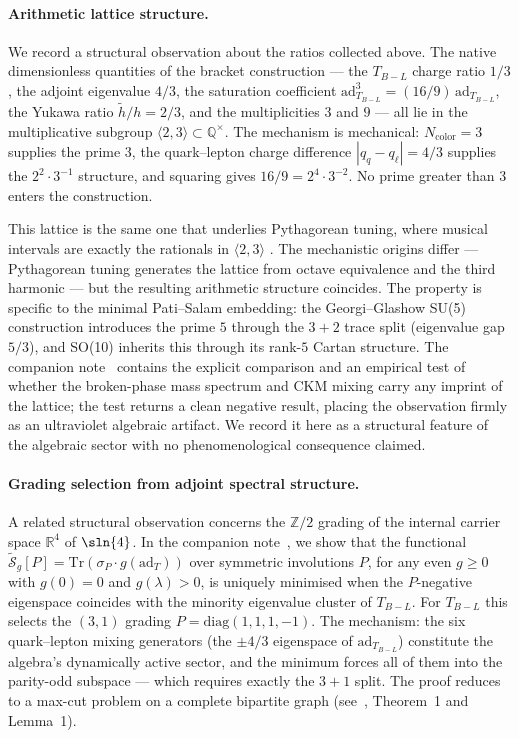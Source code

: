 \documentclass[11pt,a4paper]{article}
\theoremstyle{plain}
\theoremstyle{definition}
\theoremstyle{remark}
\begin{document}
\paragraph{Arithmetic lattice structure.}
We record a structural observation about the ratios collected above.
The native dimensionless quantities of the bracket
construction --- the $T_{B-L}$ charge ratio $1/3$, the adjoint
eigenvalue $4/3$, the saturation coefficient
$\mathrm{ad}_{T_{B-L}}^3 = (16/9)\,\mathrm{ad}_{T_{B-L}}$, the Yukawa ratio
$\tilde{h}/h = 2/3$, and the multiplicities $3$ and $9$ --- all lie
in the multiplicative subgroup
$\langle 2, 3 \rangle \subset \mathbb{Q}^\times$.  The mechanism is
mechanical: $N_{\mathrm{color}} = 3$ supplies the prime $3$, the
quark--lepton charge difference $|q_q - q_\ell| = 4/3$ supplies the
$2^2 \cdot 3^{-1}$ structure, and squaring gives
$16/9 = 2^4 \cdot 3^{-2}$.  No prime greater than $3$ enters the
construction.

This lattice is the same one that underlies Pythagorean tuning, where
musical intervals are exactly the rationals in $\langle 2, 3 \rangle$
\cite{Barker1989}.  The mechanistic origins differ --- Pythagorean
tuning generates the lattice from octave equivalence and the third
harmonic --- but the resulting arithmetic structure coincides.  The
property is specific to the minimal Pati--Salam embedding: the
Georgi--Glashow SU(5) construction introduces the prime $5$ through
the $3+2$ trace split (eigenvalue gap $5/3$), and SO(10) inherits
this through its rank-$5$ Cartan structure.  The companion
note~\cite{WallaceN1} contains the explicit comparison and an
empirical test of whether the broken-phase mass spectrum and CKM
mixing carry any imprint of the lattice; the test returns a clean
negative result, placing the observation firmly as an ultraviolet
algebraic artifact.  We record it here as a structural feature of
the algebraic sector with no phenomenological consequence claimed.

\paragraph{Grading selection from adjoint spectral structure.}
A related structural observation concerns the $\mathbb{Z}/2$
grading of the internal carrier space $\mathbb{R}^4$ of $\sln{4}$.
In the companion note~\cite{WallaceN2}, we show that the functional
$\widetilde{\mathcal{S}}_g[P] = \mathrm{Tr}(\sigma_P \cdot g(\mathrm{ad}_T))$
over symmetric involutions $P$, for any even $g \ge 0$ with
$g(0) = 0$ and $g(\lambda) > 0$, is uniquely minimised when the
$P$-negative eigenspace coincides with the minority eigenvalue
cluster of $T_{B{-}L}$.  For $T_{B{-}L}$ this selects the
$(3,1)$ grading $P = \mathrm{diag}(1,1,1,-1)$.  The mechanism:
the six quark--lepton mixing generators (the $\pm 4/3$ eigenspace
of $\mathrm{ad}_{T_{B{-}L}}$) constitute the algebra's dynamically
active sector, and the minimum forces all of them into the
parity-odd subspace --- which requires exactly the $3{+}1$ split.
The proof reduces to a max-cut problem on a complete bipartite
graph (see~\cite{WallaceN2}, Theorem~1 and Lemma~1).
\end{document}
